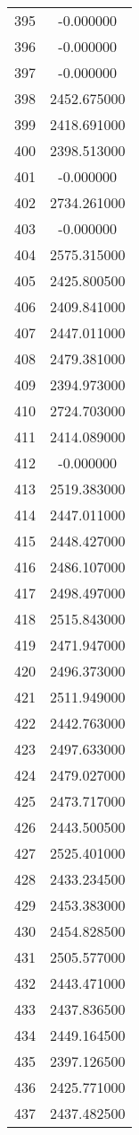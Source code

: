 \documentclass[12pt]{article}
\begin{document}
\begin{longtable}{@{}cc@{}}
395 & -0.000000 \\
396 & -0.000000 \\
397 & -0.000000 \\
398 & 2452.675000 \\
399 & 2418.691000 \\
400 & 2398.513000 \\
401 & -0.000000 \\
402 & 2734.261000 \\
403 & -0.000000 \\
404 & 2575.315000 \\
405 & 2425.800500 \\
406 & 2409.841000 \\
407 & 2447.011000 \\
408 & 2479.381000 \\
409 & 2394.973000 \\
410 & 2724.703000 \\
411 & 2414.089000 \\
412 & -0.000000 \\
413 & 2519.383000 \\
414 & 2447.011000 \\
415 & 2448.427000 \\
416 & 2486.107000 \\
417 & 2498.497000 \\
418 & 2515.843000 \\
419 & 2471.947000 \\
420 & 2496.373000 \\
421 & 2511.949000 \\
422 & 2442.763000 \\
423 & 2497.633000 \\
424 & 2479.027000 \\
425 & 2473.717000 \\
426 & 2443.500500 \\
427 & 2525.401000 \\
428 & 2433.234500 \\
429 & 2453.383000 \\
430 & 2454.828500 \\
431 & 2505.577000 \\
432 & 2443.471000 \\
433 & 2437.836500 \\
434 & 2449.164500 \\
435 & 2397.126500 \\
436 & 2425.771000 \\
437 & 2437.482500 \\

\end{longtable}
\end{document}

